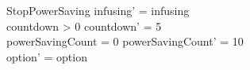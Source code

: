 \begin{schema}{StopPowerSaving}
	infusing' = infusing\\
	countdown > 0 \land countdown' = 5\\
	powerSavingCount = 0 \land powerSavingCount' = 10\\ option' = option\\
\end{schema}

